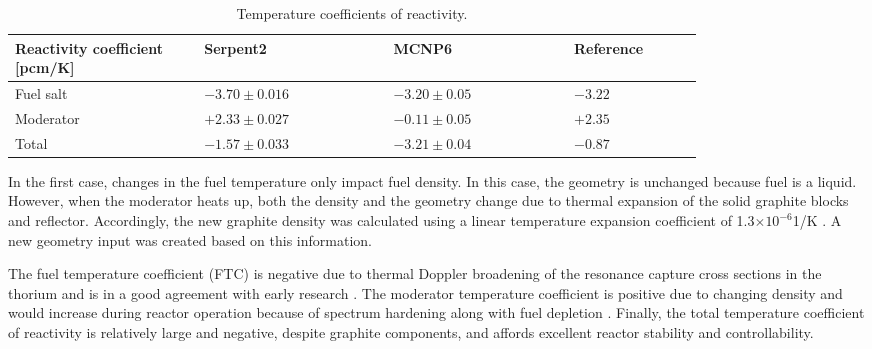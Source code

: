 \captionsetup[table]{
  labelsep = newline,
  name = TABLE, justification=justified,
  singlelinecheck=false,%
  labelsep=colon,%
  skip = \medskipamount}
\begin{table}[h!]
  \caption{Temperature coefficients of reactivity.}
\begin{tabular}{p{0.22\linewidth} p{0.22\linewidth} p{0.21\linewidth} 
        p{0.15\linewidth}} \toprule
   Reactivity coefficient [pcm/K]  & Serpent2      & MCNP6 
        \cite{park_whole_2015}   & Reference \cite{robertson_conceptual_1971}      
        \\ \midrule
Fuel salt        & $-3.70\pm0.016$ & $-3.20\pm0.05$ & $-3.22$ \\ \midrule
Moderator        & $+2.33\pm0.027$ & $-0.11\pm0.05$ & $+2.35$ \\ \midrule
Total            & $-1.57\pm0.033$ & $-3.21\pm0.04$ & $-0.87$ \\
\bottomrule
\end{tabular}
  \label{tab:tcoef}
\end{table}
In the first case, changes in the fuel temperature only impact fuel density. In 
this case, the geometry is unchanged because fuel is a liquid. However, when 
the moderator heats up, both the density and the geometry change due to thermal 
expansion of the solid graphite blocks and reflector. Accordingly, the new 
graphite density was calculated using a linear temperature expansion 
coefficient of 1.3$\times10^{-6}$1/K \cite{robertson_conceptual_1971}. A new 
geometry input was created based on this information.

The fuel temperature coefficient (FTC) is negative due to thermal Doppler 
broadening of the resonance capture cross sections in the thorium and is in a 
good agreement with early research 
\cite{robertson_conceptual_1971,park_whole_2015}. The moderator temperature 
coefficient is positive due to changing density and would increase during 
reactor operation because of spectrum hardening along with fuel depletion 
\cite{park_whole_2015}. Finally, the total temperature coefficient of 
reactivity is relatively large and negative, despite graphite components, and 
affords excellent reactor stability and controllability.